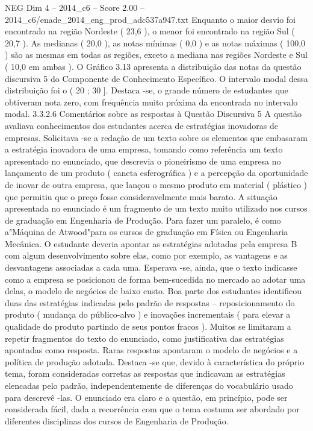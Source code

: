 \begin{textsample}{NEG Dim 4 – 2014\_c6 – Score 2.00 – 2014\_c6/enade\_2014\_eng\_prod\_adc537a947.txt}
Enquanto o maior desvio foi encontrado na região Nordeste ( 23,6 ), o menor foi encontrado na região Sul ( 20,7 ).
As medianas ( 20,0 ), as notas mínimas ( 0,0 ) e as notas máximas ( 100,0 ) são as mesmas em todas as regiões, exceto a mediana nas regiões Nordeste e Sul ( 10,0 em ambas ).
O Gráfico 3.13 apresenta a distribuição das notas da questão discursiva 5 do Componente de Conhecimento Específico.
O intervalo modal dessa distribuição foi o ( 20 ; 30 ].
Destaca -se, o grande número de estudantes que obtiveram nota zero, com frequência muito próxima da encontrada no intervalo modal. 3.3.2.6 Comentários sobre as respostas à Questão Discursiva 5 A questão avaliava conhecimentos dos estudantes acerca de estratégias inovadoras de empresas.
Solicitava -se a redação de um texto sobre os elementos que embasaram a estratégia inovadora de uma empresa, tomando como referência um texto apresentado no enunciado, que descrevia o pioneirismo de uma empresa no lançamento de um produto ( caneta esferográfica ) e a percepção da oportunidade de inovar de outra empresa, que lançou o mesmo produto em material ( plástico ) que permitiu que o preço fosse consideravelmente mais barato.
A situação apresentada no enunciado é um fragmento de um texto muito utilizado nos cursos de graduação em Engenharia de Produção.
Para fazer um paralelo, é como a"Máquina de Atwood"para os cursos de graduação em Física ou Engenharia Mecânica.
O estudante deveria apontar as estratégias adotadas pela empresa B com algum desenvolvimento sobre elas, como por exemplo, as vantagens e as desvantagens associadas a cada uma.
Esperava -se, ainda, que o texto indicasse como a empresa se posicionou de forma bem-sucedida no mercado ao adotar uma delas, o modelo de negócios de baixo custo.
Boa parte dos estudantes identificou duas das estratégias indicadas pelo padrão de respostas – reposicionamento do produto ( mudança do público-alvo ) e inovações incrementais ( para elevar a qualidade do produto partindo de seus pontos fracos ).
Muitos se limitaram a repetir fragmentos do texto do enunciado, como justificativa das estratégias apontadas como resposta.
Raras respostas apontaram o modelo de negócios e a política de produção adotada.
Destaca -se que, devido à característica do próprio tema, foram consideradas corretas as respostas que indicavam as estratégias elencadas pelo padrão, independentemente de diferenças do vocabulário usado para descrevê -las.
O enunciado era claro e a questão, em princípio, pode ser considerada fácil, dada a recorrência com que o tema costuma ser abordado por diferentes disciplinas dos cursos de Engenharia de Produção.

\end{textsample}
